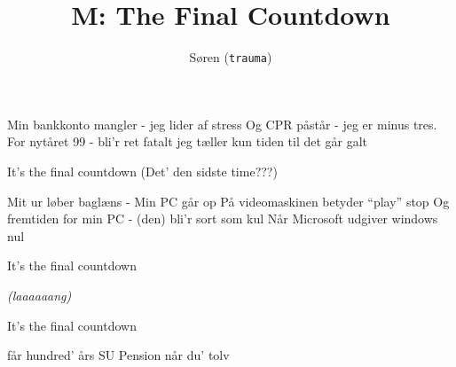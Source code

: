 \documentclass[danish]{article}
\title{M: The Final Countdown}
\author{Søren (\texttt{trauma})}
\begin{document}
\twocolumn[ %
\maketitle

]
\begin{song}

 Min bankkonto mangler - jeg lider af stress
Og CPR påstår - jeg er minus tres.
For nytåret 99 - bli'r ret fatalt
jeg tæller kun tiden til det går galt

 It's the final countdown (Det' den sidste time???)

 Mit ur løber baglæns - Min PC går op 
På videomaskinen betyder ``play'' stop
Og fremtiden for min PC - (den) bli'r sort som kul
Når Microsoft udgiver windows nul

 It's the final countdown

 \emph{(laaaaaang)}

 It's the final countdown

får hundred' års SU
Pension når du' tolv


\end{song}
\end{document}
